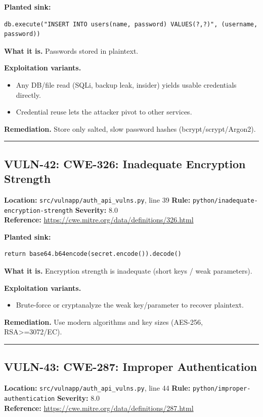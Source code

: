 \documentclass[11pt,a4paper]{article}
\begin{document}
\noindent\textbf{Planted sink:}
\begin{lstlisting}
db.execute("INSERT INTO users(name, password) VALUES(?,?)", (username, password))
\end{lstlisting}
\noindent\textbf{What it is.} Passwords stored in plaintext.

\noindent\textbf{Exploitation variants.}
\begin{itemize}[leftmargin=1.4em,itemsep=1pt,topsep=2pt]
\item Any DB/file read (SQLi, backup leak, insider) yields usable credentials directly.
\item Credential reuse lets the attacker pivot to other services.
\end{itemize}
\noindent\textbf{Remediation.} Store only salted, slow password hashes (bcrypt/scrypt/Argon2).

\vspace{4pt}\hrule\vspace{6pt}
\subsection{VULN-42: CWE-326: Inadequate Encryption Strength}
\noindent\textbf{Location:} \texttt{src/vulnapp/auth\_api\_vulns.py}, line 39 \quad \textbf{Rule:} \texttt{python/inadequate-encryption-strength} \quad \textbf{Severity:} 8.0
\\ \textbf{Reference:} \url{https://cwe.mitre.org/data/definitions/326.html}

\noindent\textbf{Planted sink:}
\begin{lstlisting}
return base64.b64encode(secret.encode()).decode()
\end{lstlisting}
\noindent\textbf{What it is.} Encryption strength is inadequate (short keys / weak parameters).

\noindent\textbf{Exploitation variants.}
\begin{itemize}[leftmargin=1.4em,itemsep=1pt,topsep=2pt]
\item Brute-force or cryptanalyze the weak key/parameter to recover plaintext.
\end{itemize}
\noindent\textbf{Remediation.} Use modern algorithms and key sizes (AES-256, RSA>=3072/EC).

\vspace{4pt}\hrule\vspace{6pt}
\subsection{VULN-43: CWE-287: Improper Authentication}
\noindent\textbf{Location:} \texttt{src/vulnapp/auth\_api\_vulns.py}, line 44 \quad \textbf{Rule:} \texttt{python/improper-authentication} \quad \textbf{Severity:} 8.0
\\ \textbf{Reference:} \url{https://cwe.mitre.org/data/definitions/287.html}
\end{document}
